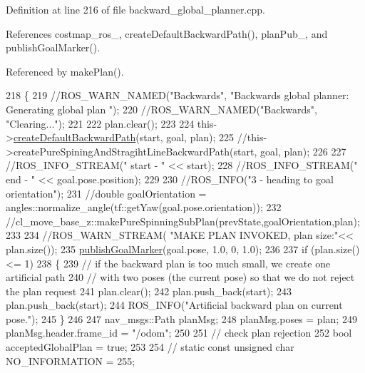 Definition at line 216 of file backward\+\_\+global\+\_\+planner.\+cpp.



References costmap\+\_\+ros\+\_\+, create\+Default\+Backward\+Path(), plan\+Pub\+\_\+, and publish\+Goal\+Marker().



Referenced by make\+Plan().


\begin{DoxyCode}
218 \{
219     \textcolor{comment}{//ROS\_WARN\_NAMED("Backwards", "Backwards global planner: Generating global plan ");}
220     \textcolor{comment}{//ROS\_WARN\_NAMED("Backwards", "Clearing...");}
221 
222     plan.clear();
223 
224     this->\hyperlink{classcl__move__base__z_1_1backward__global__planner_1_1BackwardGlobalPlanner_a1b4d2eb717f9f63f2309def37c6ce297}{createDefaultBackwardPath}(start, goal, plan);
225     \textcolor{comment}{//this->createPureSpiningAndStragihtLineBackwardPath(start, goal, plan);}
226 
227     \textcolor{comment}{//ROS\_INFO\_STREAM(" start - " << start);}
228     \textcolor{comment}{//ROS\_INFO\_STREAM(" end - " << goal.pose.position);}
229 
230     \textcolor{comment}{//ROS\_INFO("3 - heading to goal orientation");}
231     \textcolor{comment}{//double goalOrientation = angles::normalize\_angle(tf::getYaw(goal.pose.orientation));}
232     \textcolor{comment}{//cl\_move\_base\_z::makePureSpinningSubPlan(prevState,goalOrientation,plan);}
233 
234     \textcolor{comment}{//ROS\_WARN\_STREAM( "MAKE PLAN INVOKED, plan size:"<< plan.size());}
235     \hyperlink{classcl__move__base__z_1_1backward__global__planner_1_1BackwardGlobalPlanner_a3c6784cad10fdadf28323380fe3d6d2b}{publishGoalMarker}(goal.pose, 1.0, 0, 1.0);
236 
237     \textcolor{keywordflow}{if} (plan.size() <= 1)
238     \{
239         \textcolor{comment}{// if the backward plan is too much small, we create one artificial path}
240         \textcolor{comment}{// with two poses (the current pose) so that we do not reject the plan request        }
241         plan.clear();
242         plan.push\_back(start);
243         plan.push\_back(start);
244         ROS\_INFO(\textcolor{stringliteral}{"Artificial backward plan on current pose."});
245     \}
246 
247     nav\_msgs::Path planMsg;
248     planMsg.poses = plan;
249     planMsg.header.frame\_id = \textcolor{stringliteral}{"/odom"};
250 
251         \textcolor{comment}{// check plan rejection}
252     \textcolor{keywordtype}{bool} acceptedGlobalPlan = \textcolor{keyword}{true};
253 
254     \textcolor{comment}{// static const unsigned char NO\_INFORMATION = 255;}

\end{DoxyCode}
